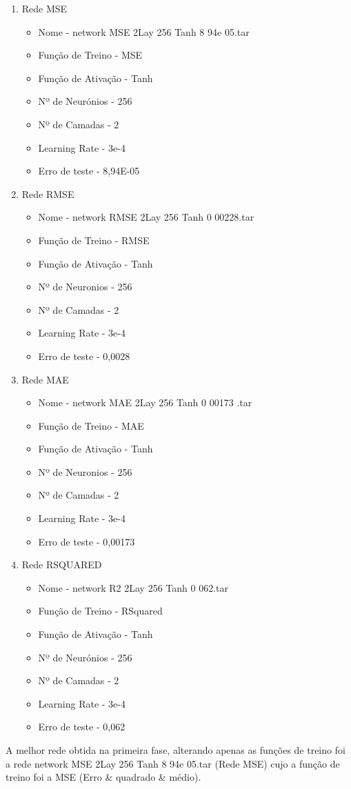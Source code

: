 \documentclass[10pt]{article}
\begin{document}
\begin{enumerate}
\item Rede MSE
  \begin{itemize}
    \item Nome - network MSE 2Lay 256 Tanh 8 94e 05.tar
    \item Função de Treino - MSE
    \item Função de Ativação - Tanh
    \item Nº de Neurónios - 256
    \item Nº de Camadas - 2
    \item Learning Rate - 3e-4
    \item Erro de teste - 8,94E-05
  \end{itemize}
  \vspace{2cm}
  \item Rede RMSE
  \begin{itemize}
    \item Nome - network RMSE 2Lay 256 Tanh 0 00228.tar
    \item Função de Treino - RMSE
    \item Função de Ativação - Tanh
    \item Nº de Neuronios - 256
    \item Nº de Camadas - 2
    \item Learning Rate - 3e-4
    \item Erro de teste - 0,0028
  \end{itemize}  
  \vspace{2cm}
  \item Rede MAE
  \begin{itemize} 
    \item Nome - network MAE 2Lay 256 Tanh 0 00173 .tar
    \item Função de Treino - MAE
    \item Função de Ativação - Tanh
    \item Nº de Neuronios - 256
    \item Nº de Camadas - 2
    \item Learning Rate - 3e-4
    \item Erro de teste - 0,00173
  \end{itemize}
  \vspace{2cm}
  \item Rede RSQUARED
  \begin{itemize}
    \item Nome - network R2 2Lay 256 Tanh 0 062.tar
    \item Função de Treino - RSquared
    \item Função de Ativação - Tanh
    \item Nº de Neurónios - 256
    \item Nº de Camadas - 2
    \item Learning Rate - 3e-4
    \item Erro de teste - 0,062   
  \end{itemize}
\end{enumerate}
\vspace{1cm}
A melhor rede obtida na primeira fase, alterando apenas as funções de
treino foi a rede network MSE 2Lay 256 Tanh 8 94e 05.tar (Rede MSE) cujo a 
função de treino foi a MSE (Erro \& quadrado \& médio).
\end{document}
